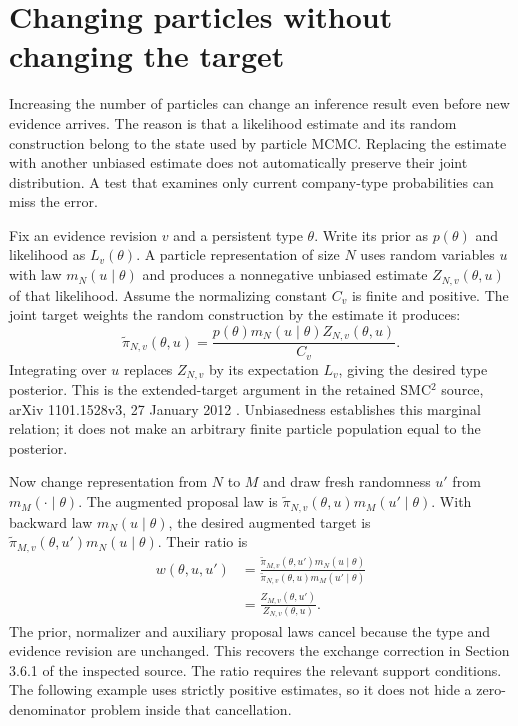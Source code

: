 \section{Changing particles without changing the target}
\label{sim:inference-exchange}

Increasing the number of particles can change an inference result even before
new evidence arrives. The reason is that a likelihood estimate and its random
construction belong to the state used by particle MCMC. Replacing the estimate
with another unbiased estimate does not automatically preserve their joint
distribution. A test that examines only current company-type probabilities
can miss the error.

Fix an evidence revision $v$ and a persistent type $\theta$. Write its prior
as $p(\theta)$ and likelihood as $L_v(\theta)$. A particle representation of
size $N$ uses random variables $u$ with law $m_N(u\mid\theta)$ and produces
a nonnegative unbiased estimate $Z_{N,v}(\theta,u)$ of that likelihood.
Assume the normalizing constant $C_v$ is finite and positive. The joint target
weights the random construction by the estimate it produces:
\begin{equation}
 \widetilde\pi_{N,v}(\theta,u)=
 \frac{p(\theta)m_N(u\mid\theta)Z_{N,v}(\theta,u)}{C_v}.
 \label{sim:extended-particle-target}
\end{equation}
Integrating over $u$ replaces $Z_{N,v}$ by its expectation $L_v$, giving the
desired type posterior. This is the extended-target argument in the retained
SMC$^2$ source, arXiv 1101.1528v3, 27 January 2012
\citep[equation (7), Proposition 1 and Appendix A]{litclosesmc2}.
Unbiasedness establishes this marginal relation; it does not make an
arbitrary finite particle population equal to the posterior.

Now change representation from $N$ to $M$ and draw fresh randomness $u'$ from
$m_M(\cdot\mid\theta)$. The augmented proposal law is
$\widetilde\pi_{N,v}(\theta,u)m_M(u'\mid\theta)$. With backward law
$m_N(u\mid\theta)$, the desired augmented target is
$\widetilde\pi_{M,v}(\theta,u')m_N(u\mid\theta)$. Their ratio is
\begin{align}
 w(\theta,u,u')
 &=\frac{\widetilde\pi_{M,v}(\theta,u')m_N(u\mid\theta)}
         {\widetilde\pi_{N,v}(\theta,u)m_M(u'\mid\theta)}\\
 &=\frac{Z_{M,v}(\theta,u')}{Z_{N,v}(\theta,u)}.
 \label{sim:exchange-weight}
\end{align}
The prior, normalizer and auxiliary proposal laws cancel because the type and
evidence revision are unchanged. This recovers the exchange correction in
Section 3.6.1 of the inspected source. The ratio requires the relevant support
conditions. The following example uses strictly positive estimates, so it
does not hide a zero-denominator problem inside that cancellation.

